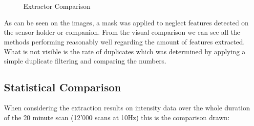 {{        \begin{figure}[ht]
            \centering
            \\
            \\
            \caption{Extractor Comparison}
        \end{figure}

        
        As can be seen on the images, a mask was applied to neglect features detected on the sensor holder or companion.
        From the visual comparison we can see all the methods performing reasonably well regarding the amount of features extracted. What is not visible is the rate of duplicates which was determined by applying a simple duplicate filtering and comparing the numbers.

    }

    \subsection{Statistical Comparison}{

        When considering the extraction results on intensity data over the whole duration of the 20 minute scan (12'000 scans at 10Hz) this is the comparison drawn:

}}
